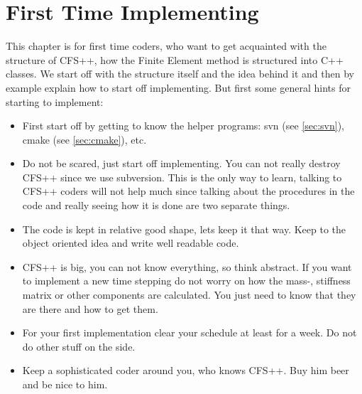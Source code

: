 \chapter{First Time Implementing}
\label{sec:first_time_implementing}
This chapter is for first time coders, who want to get acquainted with the
structure of CFS++, how the Finite Element method is structured into C++
classes. We start off with the structure itself and the idea behind it and then
by example explain how to start off implementing. But first some general hints
for starting to implement:
\begin{itemize}
  \item First start off by getting to know the helper programs: svn (see
    \ref{sec:svn}), cmake (see \ref{sec:cmake}), etc. 
  \item Do not be scared, just start off implementing. You can not really
    destroy CFS++ since we use subversion. This is the only way to learn,
    talking to CFS++ coders will not help much since talking about the
    procedures in the code and really seeing how it is done are two separate
    things.
  \item The code is kept in relative good shape, lets keep it that way. Keep
    to the object oriented idea and write well readable code.
  \item CFS++ is big, you can not know everything, so think abstract. If you
    want to implement a new time stepping do not worry on how the mass-,
    stiffness matrix or other components are calculated. You just need to know
    that they are there and how to get them.
  \item For your first implementation clear your schedule at least for a week.
    Do not do other stuff on the side.
  \item Keep a sophisticated coder around you, who knows CFS++. Buy him beer and
    be nice to him.
\end{itemize}
